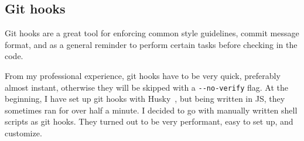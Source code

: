 \subsection{Git hooks}\label{sec:git-hooks}

Git hooks are a great tool
for enforcing common style guidelines,
commit message format,
and as a general reminder
to perform certain tasks before checking in the code.

From my professional experience,
git hooks have to be very quick,
preferably almost instant,
otherwise they will be skipped
with a \texttt{{-}{-}no-verify} flag.
At the beginning,
I have set up git hooks
with Husky~\cite{typicode_husky_2022},
but being written in JS,
they sometimes ran for over half a minute.
I decided to go with manually written shell scripts
as git hooks.
They turned out to be very performant,
easy to set up, and customize.
